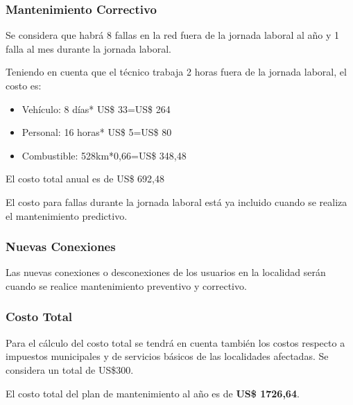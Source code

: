 \subsubsection{Mantenimiento Correctivo}

Se considera que habrá 8 fallas en la red fuera de la jornada laboral al año y 1 falla al mes durante la jornada laboral. 

Teniendo en cuenta que el técnico trabaja 2 horas fuera de la jornada laboral, el costo es:
\begin{itemize}
\item Vehículo: 8 días* US\$ 33=US\$ 264
\item Personal: 16 horas* US\$ 5=US\$ 80 
\item Combustible: 528km*0,66=US\$ 348,48
\end{itemize}

El costo total anual es de US\$ 692,48

El costo para fallas durante la jornada laboral está ya incluido cuando se realiza el mantenimiento predictivo.

\subsubsection{Nuevas Conexiones}
%
Las nuevas conexiones o desconexiones de los usuarios en la localidad serán cuando se realice mantenimiento preventivo y correctivo. 


\subsubsection{Costo Total}

Para el cálculo del costo total se tendrá en cuenta también los costos respecto a impuestos municipales y de servicios básicos de las localidades afectadas. Se considera un total de US\$300. 

El costo total del plan de mantenimiento al año es de \textbf{US\$ 1726,64}.





















